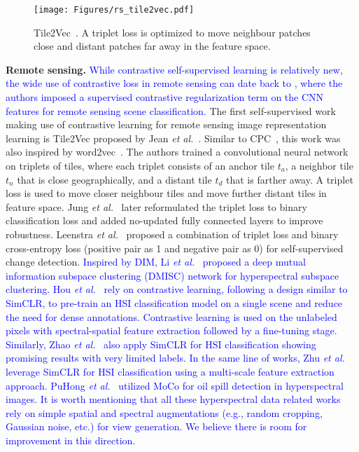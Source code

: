 \documentclass[lettersize,journal]{IEEEtran}
\newcommand{\etal}{\textit{et al.}}
\begin{document}
\begin{figure}
\centering
\texttt{[image: Figures/rs\_tile2vec.pdf]}
\caption[tile2vec]{Tile2Vec~\cite{jean2019tile2vec}. A triplet loss is optimized to move neighbour patches close and distant patches far away in the feature space.}
\label{fig:tile2vec}
\end{figure}

\textbf{Remote sensing.} \textcolor{blue}{While contrastive self-supervised learning is relatively new, the wide use of contrastive loss in remote sensing \cite{zhang2022semisupervised,yang2022laboratory,rao2022transferable,jing2022radar,zhang2020unsupervised,geng2022multi} can date back to \cite{cheng2018deep}, where the authors imposed a supervised contrastive regularization term on the CNN features for remote sensing scene classification.} 
The first self-supervised work making use of contrastive learning for remote sensing image representation learning is Tile2Vec proposed by Jean \etal~\cite{jean2019tile2vec}. Similar to CPC~\cite{oord2018representation}, this work was also inspired by word2vec~\cite{mikolov2013efficient,mikolov2013distributed}. The authors trained a convolutional neural network on triplets of tiles, where each triplet consists of an anchor tile $t_{a}$, a neighbor tile $t_{n}$ that is close geographically, and a distant tile $t_{d}$ that is farther away. A triplet loss is used to move closer neighbour tiles and move further distant tiles in feature space. Jung \etal~\cite{jung2021self} later reformulated the triplet loss to binary classification loss and added no-updated fully connected layers to improve robustness. Leenstra \etal~\cite{leenstra2021self} proposed a combination of triplet loss and binary cross-entropy loss (positive pair as 1 and negative pair as 0) for self-supervised change detection.
\textcolor{blue}{Inspired by DIM, Li \etal~\cite{li2022deep} proposed a deep mutual information subspace clustering (DMISC) network for hyperspectral subspace clustering. Hou \etal~ \cite{hou2021hyperspectral} rely on contrastive learning, following a design similar to SimCLR, to pre-train an HSI classification model on a single scene and reduce the need for dense annotations. Contrastive learning is used on the unlabeled pixels with spectral-spatial feature extraction followed by a fine-tuning stage. Similarly, Zhao \etal~ \cite{zhao2022hyperspectral} also apply SimCLR for HSI classification showing promising results with very limited labels. In the same line of works, Zhu \etal~ \cite{zhu2021sc} leverage SimCLR for HSI classification using a multi-scale feature extraction approach. PuHong \etal~ \cite{duan2022self} utilized MoCo for oil spill detection in hyperspectral images. It is worth mentioning that all these hyperspectral data related works rely on simple spatial and spectral augmentations (e.g., random cropping, Gaussian noise, etc.) for view generation. We believe there is room for improvement in this direction.}
\end{document}
